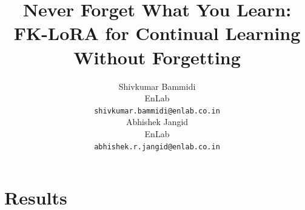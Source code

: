 \documentclass{article}
\title{Never Forget What You Learn:\\ FK-LoRA for Continual Learning Without Forgetting}
\author{%
  Shivkumar Bammidi \\
  EnLab \\
  \texttt{shivkumar.bammidi@enlab.co.in} \\
  \And
  Abhishek Jangid \\
  EnLab \\
  \texttt{abhishek.r.jangid@enlab.co.in} \\
}
\theoremstyle{definition}
\theoremstyle{remark}
\begin{document}
\maketitle



\section{Results}
\label{sec:results}










\appendix





\end{document}
